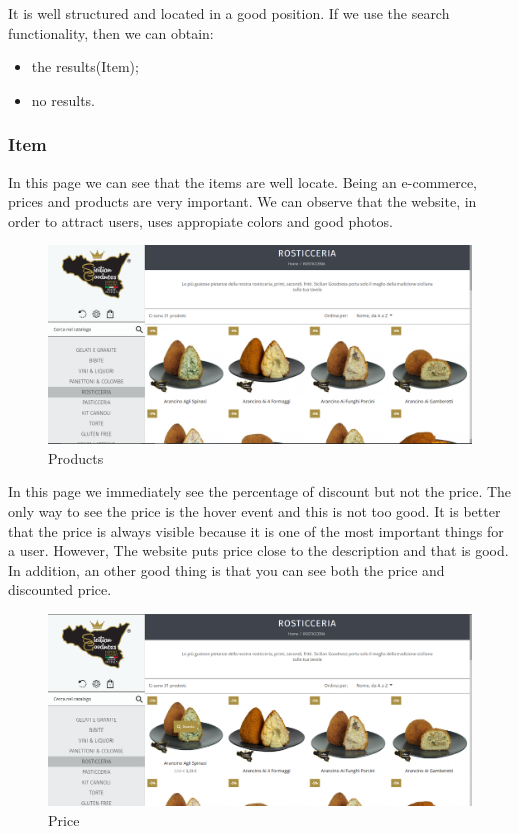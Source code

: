 It is well structured and located in a good position.
If we use the search functionality, then we can obtain:
\begin{itemize}
	\item the results(Item);
	\item no results.
\end{itemize}

\pagebreak
  
\subsubsection{Item}
In this page we can see that the items are well locate.
Being an e-commerce, prices and products are very important.
We can observe that the website, in order to attract users, uses appropiate colors and good photos.

\begin{figure}[H]
	\centering\includegraphics[width=12cm]{Img/product.png}
	\caption{Products}
\end{figure}

In this page we immediately see the percentage of discount but not the price.
The only way to see the price is the hover event and this is not too good. It is better that the price is always visible because it is one of the most important things for a user.
However, The website puts price close to the description and that is good. In addition, an other good thing is that you can see both the price and discounted price.

\begin{figure}[H]
	\centering\includegraphics[width=12cm]{Img/price.png}
	\caption{Price}
\end{figure}


